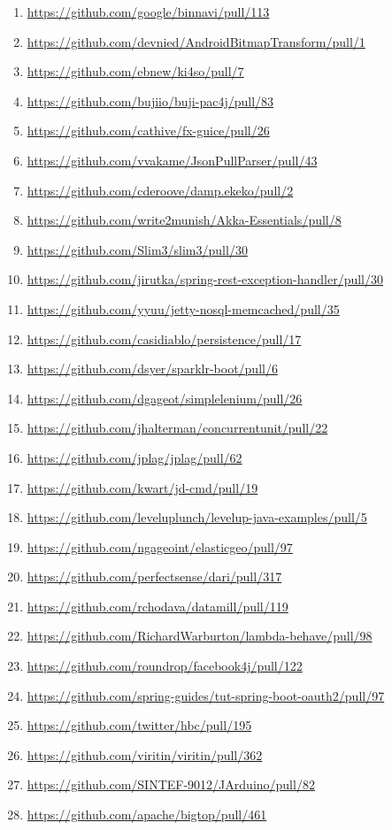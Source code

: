 \begin{enumerate}[topsep=0pt,itemsep=-1ex,partopsep=1ex,parsep=1ex]
\item \url{https://github.com/google/binnavi/pull/113}	
\item \url{https://github.com/devnied/AndroidBitmapTransform/pull/1}
\item \url{https://github.com/ebnew/ki4so/pull/7}	
\item \url{https://github.com/bujiio/buji-pac4j/pull/83}	
\item \url{https://github.com/cathive/fx-guice/pull/26}	
\item \url{https://github.com/vvakame/JsonPullParser/pull/43}		
\item \url{https://github.com/cderoove/damp.ekeko/pull/2}	
\item \url{https://github.com/write2munish/Akka-Essentials/pull/8}
\item \url{https://github.com/Slim3/slim3/pull/30}
\item \url{https://github.com/jirutka/spring-rest-exception-handler/pull/30}
\item \url{https://github.com/yyuu/jetty-nosql-memcached/pull/35}
\item \url{https://github.com/casidiablo/persistence/pull/17}	
\item \url{https://github.com/dsyer/sparklr-boot/pull/6}	
\item \url{https://github.com/dgageot/simplelenium/pull/26}	
\item \url{https://github.com/jhalterman/concurrentunit/pull/22}	
\item \url{https://github.com/jplag/jplag/pull/62}
\item \url{https://github.com/kwart/jd-cmd/pull/19}	
\item \url{https://github.com/leveluplunch/levelup-java-examples/pull/5}
\item \url{https://github.com/ngageoint/elasticgeo/pull/97}		
\item \url{https://github.com/perfectsense/dari/pull/317}		
\item \url{https://github.com/rchodava/datamill/pull/119}		
\item \url{https://github.com/RichardWarburton/lambda-behave/pull/98}
\item \url{https://github.com/roundrop/facebook4j/pull/122}	
\item \url{https://github.com/spring-guides/tut-spring-boot-oauth2/pull/97}
\item \url{https://github.com/twitter/hbc/pull/195}	
\item \url{https://github.com/viritin/viritin/pull/362}	
\item \url{https://github.com/SINTEF-9012/JArduino/pull/82}		
\item \url{https://github.com/apache/bigtop/pull/461}
\end{enumerate}